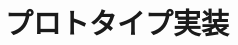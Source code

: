 \documentclass[submit,techrep,noauthor]{ipsj}
\def\|{\verb|}
\begin{document}
% \begin{itemize}
%  \item[$\Box$] 投稿前にチェックリストの各項目を満たしているか，必ず確認
% 	       する． 
% \end{itemize}

%6
\section{プロトタイプ実装}

% 本稿では，A4縦型2段組み用に変更したスタイルファイルを用いた論文のフォー
% マット方法と，論文誌ジャーナル編集委員会がまとめた「べからず集」に基づく
% 論文の書き方を示した．内容的にまだ不十分の部分が多いため，意見，要望等を
% \begin{quote}
%  \|editt@ipsj.or.jp|





 
\end{document}
